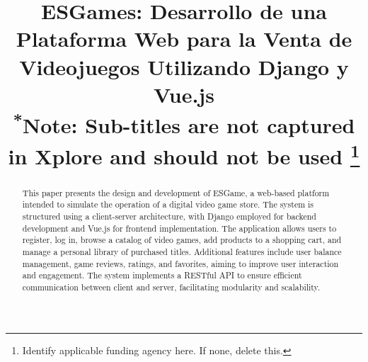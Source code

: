 \documentclass[conference]{IEEEtran}
\begin{document}
\title{ESGames: Desarrollo de una Plataforma Web para la Venta de Videojuegos Utilizando Django y Vue.js\\
{\footnotesize \textsuperscript{*}Note: Sub-titles are not captured in Xplore and
should not be used}
\thanks{Identify applicable funding agency here. If none, delete this.}
}

\author{
\and
{}
\and
{}
\and

}

\maketitle

\begin{abstract}
This paper presents the design and development of ESGame, a web-based platform intended to simulate the operation of a digital video game store. The system is structured using a client-server architecture, with Django employed for backend development and Vue.js for frontend implementation. The application allows users to register, log in, browse a catalog of video games, add products to a shopping cart, and manage a personal library of purchased titles. Additional features include user balance management, game reviews, ratings, and favorites, aiming to improve user interaction and engagement. The system implements a RESTful API to ensure efficient communication between client and server, facilitating modularity and scalability. 
\end{abstract}
\end{document}
